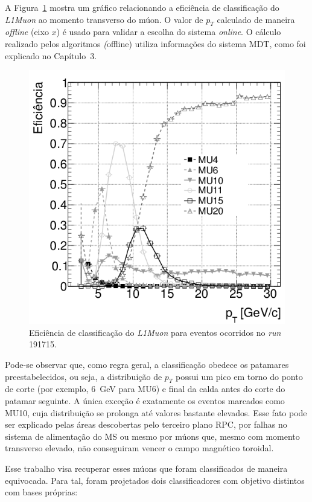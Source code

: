 A Figura~\ref{fig:muonrates} mostra um gráfico relacionando a eficiência de
classificação do \emph{L1Muon} ao momento transverso do múon. O valor de $p_T$
calculado de maneira \emph{offline} (eixo $x$) é usado para validar a escolha
do sistema \emph{online}. O cálculo realizado pelos algoritmos \emph(offline)
utiliza informações do sistema MDT, como foi explicado no Capítulo~3.

\begin{figure}[ht!]
    \centering
    \includegraphics[width=12cm]{images/ppm_rpc_turnon_mu10.png}
    \caption{Eficiência de classificação do \emph{L1Muon} para eventos
    ocorridos no \emph{run} 191715.}
    \label{fig:muonrates}
\end{figure}

Pode-se observar que, como regra geral, a classificação obedece os patamares
preestabelecidos, ou seja, a distribuição de $p_T$ possui um pico em torno do
ponto de corte (por exemplo, 6~GeV para MU6) e final da calda antes do corte do
patamar seguinte. A única exceção é exatamente os eventos marcados como MU10,
cuja distribuição se prolonga até valores bastante elevados. Esse fato pode ser
explicado pelas áreas descobertas pelo terceiro plano RPC, por falhas no sistema
de alimentação do MS ou mesmo por múons que, mesmo com momento transverso
elevado, não conseguiram vencer o campo magnético toroidal.

Esse trabalho visa recuperar esses múons que foram classificados de maneira
equivocada. Para tal, foram projetados dois classificadores com objetivo
distintos com bases próprias:


